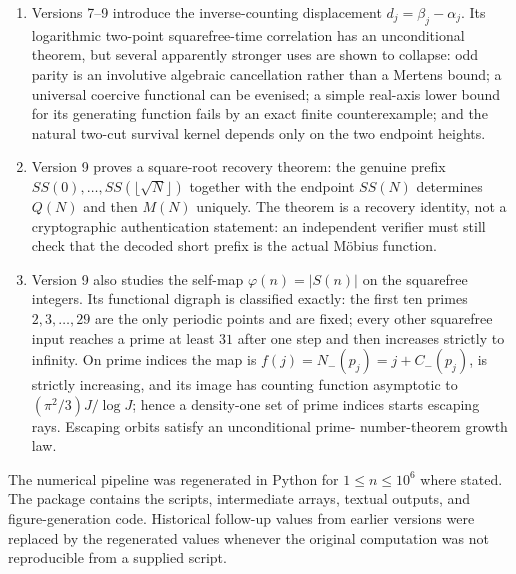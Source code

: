 \documentclass[11pt]{amsart}
\numberwithin{equation}{section}
\theoremstyle{plain}
\theoremstyle{definition}
\theoremstyle{remark}
\begin{document}
\begin{enumerate}[label=(\roman*)]
the sign or zeta phase of $M$. No such coupling is detected at the present
scale. With effective sample about $1.7\times10^4$, the tests only exclude
linear effects larger than roughly $0.015$ and do not constitute a theorem of
independence.
\item Versions 7--9 introduce the inverse-counting displacement
$d_j=\beta_j-\alpha_j$.  Its logarithmic two-point squarefree-time correlation
has an unconditional theorem, but several apparently stronger uses are shown
to collapse: odd parity is an involutive algebraic cancellation rather than a
Mertens bound; a universal coercive functional can be evenised; a simple
real-axis lower bound for its generating function fails by an exact finite
counterexample; and the natural two-cut survival kernel depends only on the
two endpoint heights.
\item Version 9 proves a square-root recovery theorem: the genuine prefix
$SS(0),\ldots,SS(\lfloor\sqrt N\rfloor)$ together with the endpoint $SS(N)$
determines $Q(N)$ and then $M(N)$ uniquely.  The theorem is a recovery identity,
not a cryptographic authentication statement: an independent verifier must still
check that the decoded short prefix is the actual M\"obius function.
\item Version 9 also studies the self-map $\varphi(n)=|S(n)|$ on the squarefree
integers.  Its functional digraph is classified exactly: the first ten primes
$2,3,\ldots,29$ are the only periodic points and are fixed; every other
squarefree input reaches a prime at least $31$ after one step and then increases
strictly to infinity.  On prime indices the map is
$f(j)=N_-(p_j)=j+C_-(p_j)$, is strictly increasing, and its image has counting
function asymptotic to $(\pi^2/3)J/\log J$; hence a density-one set of prime
indices starts escaping rays.  Escaping orbits satisfy an unconditional prime-
number-theorem growth law.
\end{enumerate}

The numerical pipeline was regenerated in Python for $1\le n\le10^{6}$ where
stated.  The package contains the scripts, intermediate arrays, textual outputs,
and figure-generation code.  Historical follow-up values from earlier versions
were replaced by the regenerated values whenever the original computation was
not reproducible from a supplied script.
\end{document}
